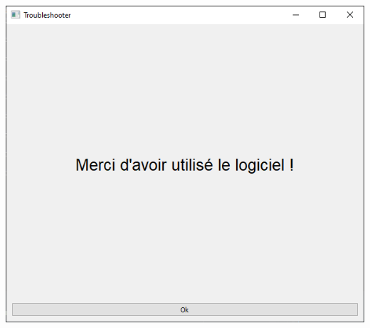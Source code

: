 \documentclass[a4paper,11pt]{article}
\theoremstyle{plain}
\theoremstyle{definition}
\begin{document}
\begin{center}
\includegraphics[scale=0.667]{Figures/fim}
\end{center}
\end{document}
